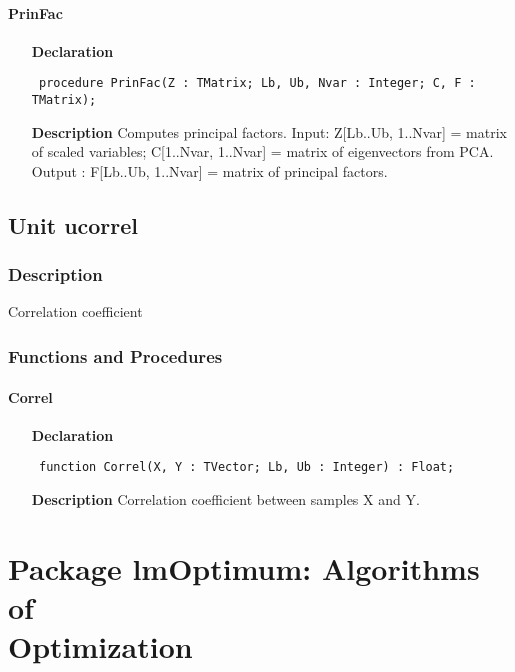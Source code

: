 \documentclass[12pt,a4paper,oneside]{report}
\newcommand{\declarationitem}[1]{\textbf{#1}}
\newcommand{\descriptiontitle}[1]{\textbf{#1}}
\newcommand{\code}[1]{\texttt{#1}}
\begin{document}
\subsubsection{PrinFac}
\label{upca-PrinFac}
\begin{itemize}\item[\declarationitem{Declaration}\hfill]
	\begin{flushleft}
		\code{
			procedure PrinFac(Z : TMatrix; Lb, Ub, Nvar : Integer; C, F : TMatrix);}
	\end{flushleft}
	\item[\descriptiontitle{Description}]
	Computes principal factors. Input: Z[Lb..Ub, 1..Nvar] = matrix of scaled variables; C[1..Nvar, 1..Nvar] = matrix of eigenvectors from PCA. Output : F[Lb..Ub, 1..Nvar] = matrix of principal factors.
\end{itemize}

\section{Unit ucorrel}
\label{ucorrel}
\subsection{Description}
Correlation coefficient
\subsection{Functions and Procedures}
\subsubsection{Correl}
\label{ucorrel-Correl}
\begin{itemize}\item[\declarationitem{Declaration}\hfill]
	\begin{flushleft}
		\code{
			function Correl(X, Y : TVector; Lb, Ub : Integer) : Float;}
	\end{flushleft}
	\item[\descriptiontitle{Description}]
	Correlation coefficient between samples X and Y.
\end{itemize}
\chapter[Package lmOptimum]{Package lmOptimum: Algorithms of \\ Optimization }\label{package-lmOptimum}
\end{document}
